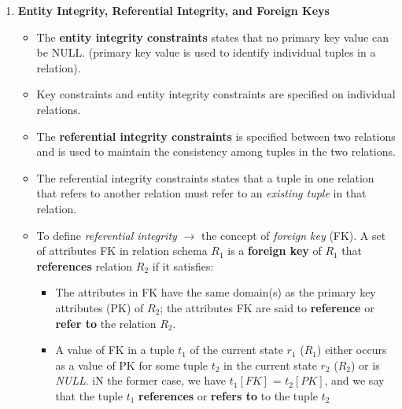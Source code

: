 \documentclass[10pt]{article}
\begin{document}
\begin{enumerate}
	\item \textbf{Entity Integrity, Referential Integrity, and Foreign Keys}
	\begin{itemize}
		\item The \textbf{entity integrity constraints} states that no primary key value can be NULL. (primary key value is used to identify individual tuples in a relation).
		\item Key constraints and entity integrity constraints are specified on individual relations.
		\item The \textbf{referential integrity constraints} is specified between two relations and is used to maintain the consistency among tuples in the two relations.
		\item The referential integrity constraints states that a tuple in one relation that refers to another relation must refer to an \textit{existing tuple} in that relation.
		\item To define \textit{referential integrity} $\rightarrow$ the concept of \textit{foreign key} (FK). A set of attributes FK in relation schema $R_1$ is a \textbf{foreign key} of $R_1$ that \textbf{references} relation $R_2$ if it satisfies:
		\begin{itemize}
			\item The attributes in FK have the same domain(s) as the primary key attributes (PK) of $R_2$; the attributes FK are said to \textbf{reference} or \textbf{refer to} the relation $R_2$.
			\item A value of FK in a tuple $t_1$ of the current state $r_1$ ($R_1$) either occurs as a value of PK for some tuple $t_2$ in the current state $r_2$ ($R_2$) or is \textit{NULL}. iN the former case, we have $t_1[FK]$ = $t_2[PK]$, and we say that the tuple $t_1$ \textbf{references} or \textbf{refers to} to the tuple $t_2$
		\end{itemize}   
	\end{itemize}
\end{enumerate}
\end{document}
